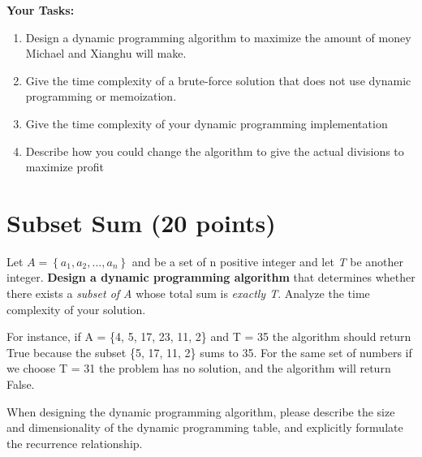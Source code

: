 \documentclass{article}[12pt]
\begin{document}
\noindent\textbf{Your Tasks:}
\begin{enumerate}
    \item Design a dynamic programming algorithm to maximize the amount of money Michael and Xianghu will make.
    \item Give the time complexity of a brute-force solution that does not use dynamic programming or memoization.
    \item Give the time complexity of your dynamic programming implementation
    \item Describe how you could change the algorithm to give the actual divisions to maximize profit
\end{enumerate}


\section{Subset Sum (20 points)  }
Let $A = \left\{a_1 , a_2 ,. . . , a_n \right\}$ and be a set of n positive integer and let \textit{T} be another integer. \textbf{Design a dynamic programming algorithm} that determines whether there exists a \textit{subset of A} whose total sum is \textit{exactly T}. Analyze the time complexity
of your solution.

For instance, if A = \{4, 5, 17, 23, 11, 2\} and T = 35 the algorithm should return True because the subset \{5, 17, 11, 2\} sums to 35. For the same set of numbers if we choose T = 31 the problem has no solution, and the algorithm will return False.

When designing the dynamic programming algorithm, please describe the size and dimensionality of the dynamic programming table, and explicitly formulate the recurrence relationship. 
\end{document}
